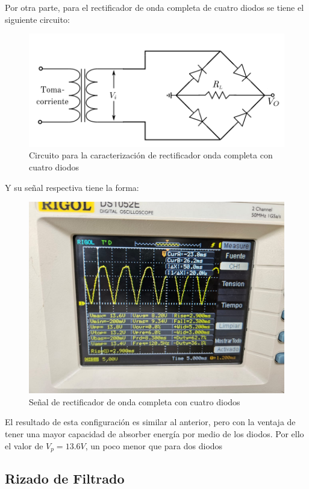 \documentclass[10pt,letterpaper]{article}
\begin{document}
Por otra parte, para el rectificador de onda completa de cuatro diodos se tiene el siguiente circuito:
\begin{figure}[H]
	\centering
	\includegraphics[scale=1]{OndaCompleta4.png}
	\caption{Circuito para la caracterización de rectificador onda completa con cuatro diodos}
	\label{fig:enter-label}
\end{figure}
Y su señal respectiva tiene la forma:

\begin{figure}[H]
	\centering
	\includegraphics[scale=.35]{Osc_OndaCompleta4D.jpg}
	\caption{Señal de rectificador de onda completa con cuatro diodos}
	\label{fig:enter-label}
\end{figure}

El resultado de esta configuración es similar al anterior, pero con la ventaja de tener una mayor
capacidad de absorber energía por medio de los diodos. Por ello el valor de $V_p=13.6 V$, un poco menor que para dos diodos\\


\subsection{Rizado de Filtrado}
\end{document}
